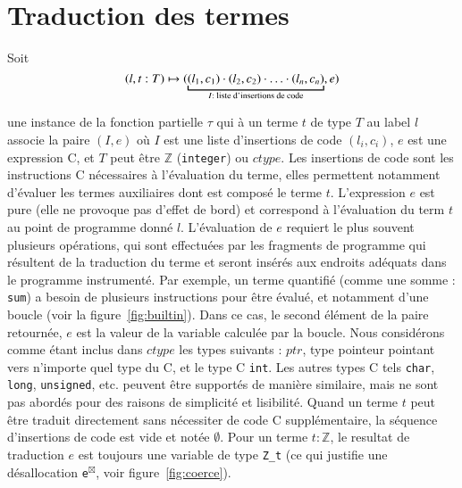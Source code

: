 \section{Traduction des termes \eacsl}
\label{sec:term}




Soit
\[
(l, t:T) \rulearrow (\underbracket{(l_1, c_1) \concat (l_2, c_2) \concat \ldots
  \concat (l_n, c_n)}_{I : \text{ liste d'insertions de code}}, e)
\]

une instance de la fonction partielle $\tau$ qui à un terme \eacsl $t$ de type
$T$ au label $l$ associe la paire $(I, e)$ où $I$ est une liste d'insertions de
code $(l_i, c_i)$, $e$ est une expression C, et $T$ peut être $\mathbb{Z}$
(\lstinline'integer') ou $ctype$.
Les insertions de code sont les instructions C nécessaires à l'évaluation du
terme, elles permettent notamment d'évaluer les termes auxiliaires dont est
composé le terme $t$.
L'expression $e$ est pure (elle ne provoque pas d'effet de bord) et correspond
à l'évaluation du term $t$ au point de programme donné $l$.
L'évaluation de $e$ requiert le plus souvent plusieurs opérations, qui sont
effectuées par les fragments de programme qui résultent de la traduction du
terme et seront insérés aux endroits adéquats dans le programme instrumenté.
Par exemple, un terme quantifié (comme une somme : \lstinline'sum') a besoin de
plusieurs instructions pour être évalué, et notamment d'une boucle (voir la
figure~\ref{fig:builtin}).
Dans ce cas, le second élément de la paire retournée, $e$ est la valeur de la
variable calculée par la boucle.
Nous considérons comme étant inclus dans $ctype$ les types suivants : $ptr$,
type pointeur pointant vers n'importe quel type du C, et le type C
\lstinline'int'.
Les autres types C tels \lstinline'char', \lstinline'long',
\lstinline'unsigned', etc. peuvent être supportés de manière similaire, mais ne
sont pas abordés pour des raisons de simplicité et lisibilité.
Quand un terme $t$ peut être traduit directement sans nécessiter de code C
supplémentaire, la séquence d'insertions de code est vide et notée $\emptyset$.
Pour un terme $t:\mathbb{Z}$, le resultat de traduction $e$ est toujours une
variable de type \lstinline'Z_t' (ce qui justifie une désallocation
\lstinline{e}${}^{\boxtimes}$, voir figure~\ref{fig:coerce}).

